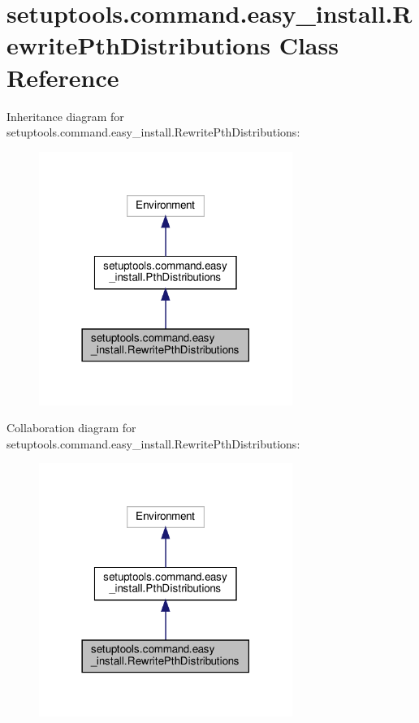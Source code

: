 \hypertarget{classsetuptools_1_1command_1_1easy__install_1_1RewritePthDistributions}{}\section{setuptools.\+command.\+easy\+\_\+install.\+Rewrite\+Pth\+Distributions Class Reference}
\label{classsetuptools_1_1command_1_1easy__install_1_1RewritePthDistributions}


Inheritance diagram for setuptools.\+command.\+easy\+\_\+install.\+Rewrite\+Pth\+Distributions\+:
\nopagebreak
\begin{figure}[H]
\begin{center}
\leavevmode
\includegraphics[width=234pt]{classsetuptools_1_1command_1_1easy__install_1_1RewritePthDistributions__inherit__graph}
\end{center}
\end{figure}


Collaboration diagram for setuptools.\+command.\+easy\+\_\+install.\+Rewrite\+Pth\+Distributions\+:
\nopagebreak
\begin{figure}[H]
\begin{center}
\leavevmode
\includegraphics[width=234pt]{classsetuptools_1_1command_1_1easy__install_1_1RewritePthDistributions__coll__graph}
\end{center}
\end{figure}
